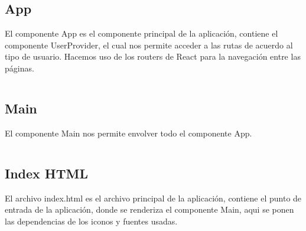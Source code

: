 \documentclass{article}
\begin{document}
\subsection{App}
El componente App es el componente principal de la aplicación, contiene el componente UserProvider, el cual nos permite acceder a las rutas de acuerdo al tipo de usuario. Hacemos uso de los routers de React para la navegación entre las páginas.
\inputminted{javascript}{../fronted/src/App.jsx}
\subsection{Main}
El componente Main nos permite envolver todo el componente App.
\inputminted{javascript}{../fronted/src/main.jsx}

\subsection{Index HTML}
El archivo index.html es el archivo principal de la aplicación, contiene el punto de entrada de la aplicación, donde se renderiza el componente Main, aqui se ponen las dependencias de los iconos y fuentes usadas.
\inputminted{html}{../fronted/index.html}
\end{document}
